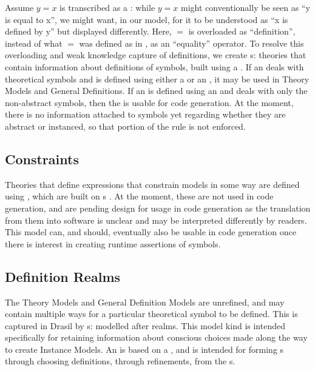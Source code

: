 Assume \(y = x\) is transcribed as a \RelationConcept{}: while \(y = x\) might
conventionally be seen as ``y is equal to x'', we might want, in our model, for
it to be understood as ``x is defined by y'' but displayed differently. Here,
\(=\) is overloaded as ``definition'', instead of what \(=\) was defined as in
\Expr{}, as an ``equality'' operator. To resolve this overloading and weak
knowledge capture of definitions, we create \EquationalModel{}s: theories that
contain information about definitions of symbols, built using a
\QDefinition{}. If an \EquationalModel{}
deals with theoretical symbols and is defined using either a \ModelExpr{} or an
\Expr{}, it may be used in Theory Models and General Definitions. If an
\EquationalModel{} is defined using an \Expr{} and deals with only the
non-abstract symbols, then the
\EquationalModel{} is usable for code generation. At the moment, there is no
information attached to symbols yet regarding whether they are abstract or
instanced, so that portion of the rule is not enforced.


\subsection{Constraints}

Theories that define expressions that constrain models in some way are defined
using \EquationalConstraints{}, which are built on \ConstraintSet{}s . At the moment, these are not used in code generation, and are pending
design for usage in code generation as the translation from them into software
is unclear and may be interpreted differently by readers. This model can, and
should, eventually also be usable in code generation once there is interest in
creating runtime assertions of symbols.


\subsection{Definition Realms}

The Theory Models and General Definition Models are unrefined, and may contain
multiple ways for a particular theoretical symbol to be defined. This is
captured in Drasil by \EquationalRealm{}s: modelled after realms. This model kind is
intended specifically for retaining information about conscious choices made
along the way to create Instance Models. An \EquationalRealm{} is based on a
\MultiDefn{}, and is intended for forming
\QDefinition{}s through choosing definitions, through refinements, from the
\MultiDefn{}s.

